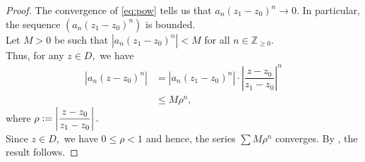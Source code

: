 \discconv*\label{prop:discconv2}
\begin{flushright}\hyperref[prop:discconv]{\upsym}\end{flushright}
\begin{proof}
	The convergence of \cref{eq:pow} tells us that $a_n(z_1 - z_0)^n \to 0.$ In particular, the sequence $(a_n(z_1 - z_0)^n)$ is bounded.\\
	Let $M > 0$ be such that $|a_n(z_1 - z_0)^n| < M$ for all $n \in \mathbb{Z}_{\ge0}.$\\
	Thus, for any $z \in D,$ we have
	\begin{align*} 
	 	|a_n(z - z_0)^n| &= |a_n(z_1 - z_0)^n| \cdot \left|\dfrac{z - z_0}{z_1 - z_0}\right|^n\\
	 	&\le M\rho^n,
	\end{align*} 
	where $\rho \vcentcolon= \left|\dfrac{z - z_0}{z_1 - z_0}\right|.$\\
	Since $z \in D,$ we have $0 \le \rho < 1$ and hence, the series $\sum M\rho^n$ converges. By , the result follows.
\end{proof}

